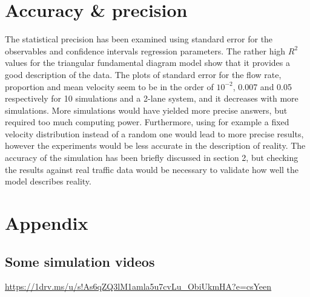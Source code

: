 \documentclass[a4paper,12pt]{article}
\begin{document}
\section{Accuracy \& precision}
The statistical precision has been examined using standard error for the observables and confidence intervals regression parameters. The rather high $R^2$ values for the triangular fundamental diagram model show that it provides a good description of the data. The plots of standard error for the flow rate, proportion and mean velocity seem to be in the order of $10^{-2}$, 0.007 and 0.05 respectively for 10 simulations and a 2-lane system, and it decreases with more simulations. More simulations would have yielded more precise answers, but required too much computing power. Furthermore, using for example a fixed velocity distribution instead of a random one would lead to more precise results, however the experiments would be less accurate in the description of reality. The accuracy of the simulation has been briefly discussed in section 2, but checking the results against real traffic data would be necessary to validate how well the model describes reality. 


\section{Appendix}
\subsection*{Some simulation videos}
\url{https://1drv.ms/u/s!As6qZQ3lM1amla5u7cvLu_ObiUkmHA?e=csYeen}

%

 
\end{document}
